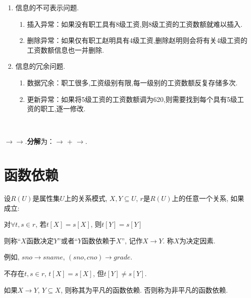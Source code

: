 \begin{enumerate}
    \item 信息的不可表示问题.
    \begin{enumerate}
        \item 插入异常：如果没有职工具有8级工资,则8级工资的工资数额就难以插入.
        \item 删除异常：如果仅有职工赵明具有4级工资,删除赵明则会将有关4级工资的工资数额信息也一并删除.
    \end{enumerate}
    \item 信息的冗余问题.
    \begin{enumerate}
        \item 数据冗余：职工很多,工资级别有限,每一级别的工资数额反复存储多次.
        \item 更新异常：如果将5级工资的工资数额调为620,则需要找到每个具有5级工资的职工,逐一修改.
    \end{enumerate}
\end{enumerate}

\ 

$\to$$\to$.\textbf{分解}为：$\to$ + $\to$.

\section{函数依赖}

\begin{definition}[函数依赖] \label{def:func-dep}
  设$R(U)$是属性集$U$上的关系模式, $X,Y\subseteq U$, $r$是$R(U)$上的任意一个关系, 如果成立:
  \begin{center}
    对$\forall t,s\in r$, 若$t[X]=s[X]$, 则$t[Y]=s[Y]$
  \end{center}
  则称``$X$函数决定$Y$''或者``$Y$函数依赖于$X$'', 记作$X\to Y$. 称$X$为决定因素.
\end{definition}

例如, $sno\to sname$, $(sno, cno)\to grade$.

\begin{definition}[函数依赖的双重否定形式的定义] \label{def:func-dep-2}
  不存在$t,s\in r$, $t[X]=s[X]$, 但$t[Y]\neq s[Y]$.
\end{definition}

\begin{definition}[平凡的函数依赖] \label{def:pingfan-func-dep}
  如果$X\to Y$, $Y\subseteq X$, 则称其为平凡的函数依赖. 否则称为非平凡的函数依赖.
\end{definition}

